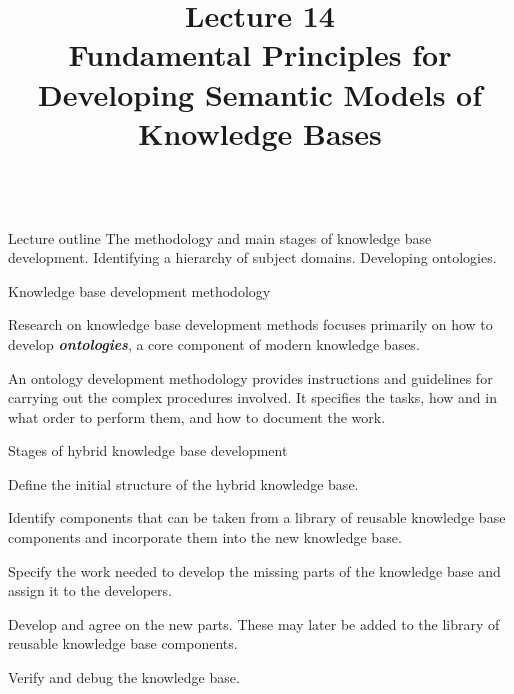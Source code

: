 \title{Lecture 14\\Fundamental Principles for Developing Semantic Models of Knowledge Bases}

\begin{frame}
	\titlepage
\end{frame}

\begin{frame}{\\Lecture outline}
	\topline
	\justifying
	The methodology and main stages of knowledge base development. Identifying a hierarchy of subject domains. Developing ontologies.
\end{frame}

\begin{frame}{Knowledge base development methodology}
	\topline
	\justifying

	Research on knowledge base development methods focuses primarily on how to develop \textbf{\textit{ontologies}}, a core component of modern knowledge bases.

	An ontology development methodology provides instructions and guidelines for carrying out the complex procedures involved. It specifies the tasks, how and in what order to perform them, and how to document the work.
\end{frame}

\begin{frame}{Stages of hybrid knowledge base development}
	\topline
	\justifying
	\vspace{8mm}
	\begin{textitemize}
		\item Define the initial structure of the hybrid knowledge base.
		\item Identify components that can be taken from a library of reusable knowledge base components and incorporate them into the new knowledge base.
		\item Specify the work needed to develop the missing parts of the knowledge base and assign it to the developers.
		\item Develop and agree on the new parts. These may later be added to the library of reusable knowledge base components.
		\item Verify and debug the knowledge base.
	\end{textitemize}
\end{frame}

